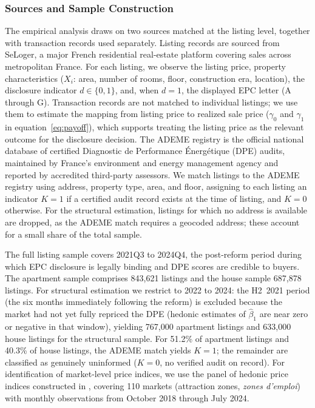 \subsubsection{Sources and Sample Construction}

The empirical analysis draws on two sources matched at the listing level, together with transaction records used separately. Listing records are sourced from SeLoger, a major French residential real-estate platform covering sales across metropolitan France. For each listing, we observe the listing price, property characteristics ($X_i$: area, number of rooms, floor, construction era, location), the disclosure indicator $d\in\{0,1\}$, and, when $d=1$, the displayed EPC letter (A through G). Transaction records are not matched to individual listings; we use them to estimate the mapping from listing price to realized sale price ($\gamma_0$ and $\gamma_1$ in equation~\eqref{eq:payoff}), which supports treating the listing price as the relevant outcome for the disclosure decision. The ADEME registry is the official national database of certified Diagnostic de Performance Énergétique (DPE) audits, maintained by France's environment and energy management agency and reported by accredited third-party assessors. We match listings to the ADEME registry using address, property type, area, and floor, assigning to each listing an indicator $K=1$ if a certified audit record exists at the time of listing, and $K=0$ otherwise. For the structural estimation, listings for which no address is available are dropped, as the ADEME match requires a geocoded address; these account for a small share of the total sample.

The full listing sample covers 2021Q3 to 2024Q4, the post-reform period during which EPC disclosure is legally binding and DPE scores are credible to buyers. The apartment sample comprises 843,621 listings and the house sample 687,878 listings. For structural estimation we restrict to 2022 to 2024: the H2~2021 period (the six months immediately following the reform) is excluded because the market had not yet fully repriced the DPE (hedonic estimates of $\hat\beta_1$ are near zero or negative in that window), yielding 767,000 apartment listings and 633,000 house listings for the structural sample. For 51.2\% of apartment listings and 40.3\% of house listings, the ADEME match yields $K=1$; the remainder are classified as genuinely uninformed ($K=0$, no verified audit on record). For identification of market-level price indices, we use the panel of hedonic price indices constructed in \citet{patras_mandatory_2024}, covering 110 markets (attraction zones, \textit{zones d'emploi}) with monthly observations from October 2018 through July 2024.

